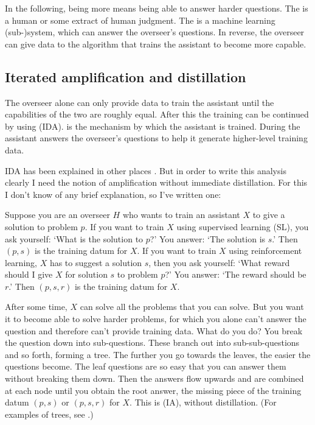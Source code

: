 \documentclass{farlamp}
\begin{document}
In the following, being more  means being able to answer harder
questions. The  is a human or some extract of human judgment. The
 is a machine learning (sub-)system, which can answer the
overseer's questions. In reverse, the overseer can give data to the algorithm
that trains the assistant to become more capable.


\subsection{Iterated amplification and distillation}
\label{sec:iad}

The overseer alone can only provide data to train the assistant until the
capabilities of the two are roughly equal. After this the training can be
continued by using  (IDA).
 is the mechanism by which the assistant is trained. During
 the assistant answers the overseer's questions to help it
generate higher-level training data.

IDA has been explained in other places \parencite{CotrIDA, ESSMLPIDA}. But in
order to write this analysis clearly I need the notion of amplification without
immediate distillation. For this I don't know of any brief explanation, so I've
written one:

Suppose you are an overseer $H$ who wants to train an assistant $X$
\parencite[symbols taken from][]{CSASupAmp} to give a solution to problem $p$.
If you want to train $X$ using supervised learning (SL), you ask yourself: ‘What
is the solution to $p$?’ You answer: ‘The solution is $s$.’ Then $(p, s)$ is the
training datum for $X$. If you want to train $X$ using reinforcement learning,
$X$ has to suggest a solution $s$, then you ask yourself: ‘What reward should I
give $X$ for solution $s$ to problem $p$?’ You answer: ‘The reward should be
$r$.’ Then $(p, s, r)$ is the training datum for $X$.

After some time, $X$ can solve all the problems that you can solve. But you want
it to become able to solve harder problems, for which you alone can't answer the
question and therefore can't provide training data. What do you do? You break
the question down into sub-questions. These branch out into sub-sub-questions
and so forth, forming a tree. The further you go towards the leaves, the easier
the questions become. The leaf questions are so easy that you can answer them
without breaking them down. Then the answers flow upwards and are combined at
each node until you obtain the root answer, the missing piece of the training
datum $(p, s)$ or $(p, s, r)$ for $X$. This is 
(IA), without distillation. (For examples of trees, see \textcite{StuhFacCog}.)
\end{document}
